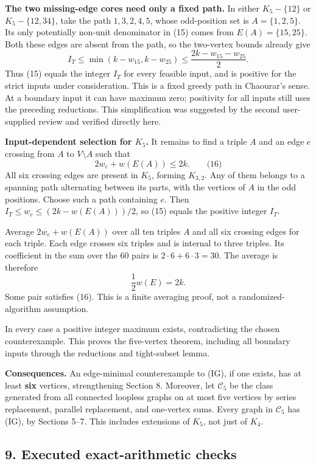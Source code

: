 \documentclass{article}
\begin{document}
\textbf{The two missing-edge cores need only a fixed path.} In either \(K_5-\{12\}\) or \(K_5-\{12,34\}\), take the path \(1,3,2,4,5\), whose odd-position set is \(A=\{1,2,5\}\). Its only potentially non-unit denominator in (15) comes from \(E(A)=\{15,25\}\). Both these edges are absent from the path, so the two-vertex bounds already give \[
I_T\le\min(k-w_{15},k-w_{25})
\le\frac{2k-w_{15}-w_{25}}2.
\] Thus (15) equals the integer \(I_T\) for every feasible input, and is positive for the strict inputs under consideration. This is a fixed greedy path in Chaourar's sense. At a boundary input it can have maximum zero; positivity for all inputs still uses the preceding reductions. This simplification was suggested by the second user-supplied review and verified directly here.

\textbf{Input-dependent selection for \(K_5\).} It remains to find a triple \(A\) and an edge \(e\) crossing from \(A\) to \(V\setminus A\) such that \[
2w_e+w(E(A))\le2k.\qquad\text{(16)}
\] All six crossing edges are present in \(K_5\), forming \(K_{3,2}\). Any of them belongs to a spanning path alternating between its parts, with the vertices of \(A\) in the odd positions. Choose such a path containing \(e\). Then \(I_T\le w_e\le(2k-w(E(A)))/2\), so (15) equals the positive integer \(I_T\).

Average \(2w_e+w(E(A))\) over all ten triples \(A\) and all six crossing edges for each triple. Each edge crosses six triples and is internal to three triples. Its coefficient in the sum over the 60 pairs is \(2\cdot6+6\cdot3=30\). The average is therefore \[
\frac12w(E)=2k.
\] Some pair satisfies (16). This is a finite averaging proof, not a randomized-algorithm assumption.

In every case a positive integer maximum exists, contradicting the chosen counterexample. This proves the five-vertex theorem, including all boundary inputs through the reductions and tight-subset lemma.

\textbf{Consequences.} An edge-minimal counterexample to (IG), if one exists, has at least \textbf{six} vertices, strengthening Section 8. Moreover, let \(\mathcal C_5\) be the class generated from all connected loopless graphs on at most five vertices by series replacement, parallel replacement, and one-vertex sums. Every graph in \(\mathcal C_5\) has (IG), by Sections 5--7. This includes extensions of \(K_5\), not just of \(K_4\).

\subsection{9. Executed exact-arithmetic checks}
\end{document}
